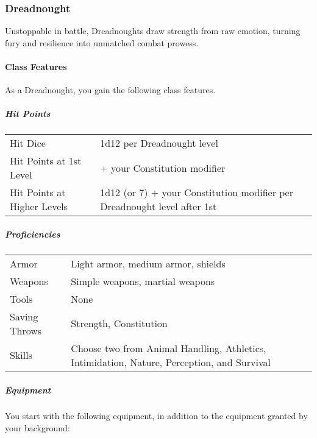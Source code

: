 \subsubsection{Dreadnought}\label{dreadnought-class}

Unstoppable in battle, Dreadnoughts draw strength from raw emotion,
turning fury and resilience into unmatched combat prowess.

\paragraph{Class Features}\label{_class_features_2}

As a Dreadnought, you gain the following class features.

\subparagraph{Hit Points}\label{_hit_points_2}

\begin{longtable}[]{@{}
  >{\raggedright\arraybackslash}p{}
  >{\raggedright\arraybackslash}p{}@{}}
\toprule\noalign{}
\endhead
\bottomrule\noalign{}
\endlastfoot
Hit Dice & 1d12 per Dreadnought level \\
Hit Points at 1st Level & 12 + your Constitution modifier \\
Hit Points at Higher Levels & 1d12 (or 7) + your Constitution modifier
per Dreadnought level after 1st \\
\end{longtable}

\subparagraph{Proficiencies}\label{_proficiencies_2}

\begin{longtable}[]{@{}
  >{\raggedright\arraybackslash}p{}
  >{\raggedright\arraybackslash}p{}@{}}
\toprule\noalign{}
\endhead
\bottomrule\noalign{}
\endlastfoot
Armor & Light armor, medium armor, shields \\
Weapons & Simple weapons, martial weapons \\
Tools & None \\
Saving Throws & Strength, Constitution \\
Skills & Choose two from Animal Handling, Athletics, Intimidation,
Nature, Perception, and Survival \\
\end{longtable}

\subparagraph{Equipment}\label{_equipment_2}

You start with the following equipment, in addition to the equipment
granted by your background:


